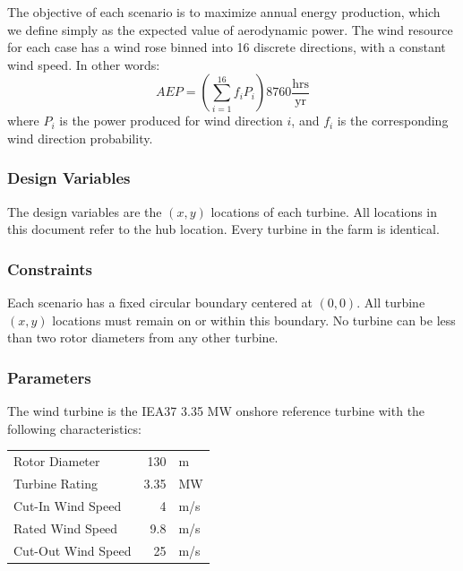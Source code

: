 \documentclass{article}
\begin{document}
        The objective of each scenario is to maximize annual energy production, which we define simply as the expected value of aerodynamic power.  The wind resource for each case has a wind rose binned into 16 discrete directions, with a constant wind speed.  In other words:
        \begin{equation*}
            AEP = \left(\sum_{i=1}^{16} f_i P_i\right) 8760 \frac{\textrm{hrs}}{\textrm{yr}}
        \end{equation*}
        where $P_i$ is the power produced for wind direction $i$, and $f_i$ is the corresponding wind direction probability.

    \subsubsection*{Design Variables}

        The design variables are the $(x, y)$ locations of each turbine.  All locations in this document refer to the hub location.  Every turbine in the farm is identical.  

    \subsubsection*{Constraints}

        Each scenario has a fixed circular boundary centered at $(0, 0)$.  All turbine $(x, y)$ locations must remain on or within this boundary.  No turbine can be less than two rotor diameters from any other turbine.

    \subsubsection*{Parameters}

        The wind turbine is the IEA37 3.35 MW onshore reference turbine \cite{NREL335MW} with the following characteristics:
        \begin{center}
            \begin{tabular}{@{}lrl@{}}
            \toprule
                Rotor Diameter & 130 & m \\ 
                Turbine Rating & 3.35 & MW \\ 
                Cut-In Wind Speed & 4 & m/s \\ 
                Rated Wind Speed & 9.8 & m/s \\ 
                Cut-Out Wind Speed & 25 & m/s \\
            \bottomrule
            \end{tabular}
        \end{center}
\end{document}
